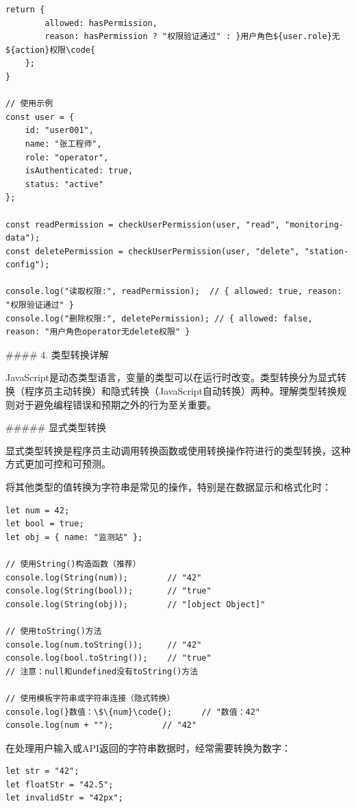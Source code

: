 {\begin{lstlisting}[style=javascript]
    return {
        allowed: hasPermission,
        reason: hasPermission ? "权限验证通过" : }用户角色${user.role}无${action}权限\code{
    };
}

// 使用示例
const user = {
    id: "user001",
    name: "张工程师",
    role: "operator",
    isAuthenticated: true,
    status: "active"
};

const readPermission = checkUserPermission(user, "read", "monitoring-data");
const deletePermission = checkUserPermission(user, "delete", "station-config");

console.log("读取权限:", readPermission);  // { allowed: true, reason: "权限验证通过" }
console.log("删除权限:", deletePermission); // { allowed: false, reason: "用户角色operator无delete权限" }
\end{lstlisting}

#### 4. 类型转换详解

JavaScript是动态类型语言，变量的类型可以在运行时改变。类型转换分为显式转换（程序员主动转换）和隐式转换（JavaScript自动转换）两种。理解类型转换规则对于避免编程错误和预期之外的行为至关重要。

##### 显式类型转换

显式类型转换是程序员主动调用转换函数或使用转换操作符进行的类型转换，这种方式更加可控和可预测。


将其他类型的值转换为字符串是常见的操作，特别是在数据显示和格式化时：

\begin{lstlisting}[style=javascript]
let num = 42;
let bool = true;
let obj = { name: "监测站" };

// 使用String()构造函数（推荐）
console.log(String(num));        // "42"
console.log(String(bool));       // "true" 
console.log(String(obj));        // "[object Object]"

// 使用toString()方法
console.log(num.toString());     // "42"
console.log(bool.toString());    // "true"
// 注意：null和undefined没有toString()方法

// 使用模板字符串或字符串连接（隐式转换）
console.log(}数值：\$\{num}\code{);      // "数值：42"
console.log(num + "");          // "42"
\end{lstlisting}


在处理用户输入或API返回的字符串数据时，经常需要转换为数字：

\begin{lstlisting}[style=javascript]
let str = "42";
let floatStr = "42.5";
let invalidStr = "42px";


\end{lstlisting}}
